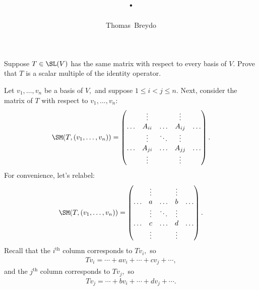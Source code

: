 \documentclass{amsart}
\title{\pagenum.\probnum}
\author{Thomas\ Breydo}
\begin{document}
\maketitle

\begin{problem*}
Suppose $T\in\SL(V)$ has the same matrix with respect to every
basis of $V.$ Prove that $T$ is a scalar multiple of the
identity operator.
\end{problem*}

\vspace{0.5in}

Let $v_1,\ldots,v_n$ be a basis of $V,$ and suppose $1\le i<j\le n.$
Next, consider the matrix of $T$ with respect to $v_1,\ldots,v_n$:
\begin{align*}
\SM(T,(v_1,\ldots,v_n)) =
    \begin{pmatrix}
        & \vdots & & \vdots & \\
       \hdots & A_{ii} & \hdots & A_{ij} & \hdots \\
                & \vdots & \ddots & \vdots & \\
       \hdots & A_{ji} & \hdots & A_{jj} & \hdots \\
              & \vdots & & \vdots &
    \end{pmatrix}.
\end{align*}
For convenience, let's relabel:
\begin{align*}
\SM(T,(v_1,\ldots,v_n)) =
    \begin{pmatrix}
        & \vdots & & \vdots & \\
       \hdots & a & \hdots & b & \hdots \\
                & \vdots & \ddots & \vdots & \\
       \hdots & c & \hdots & d & \hdots \\
              & \vdots & & \vdots &
    \end{pmatrix}.
\end{align*}
Recall that the $i^\text{th}$ column corresponds to $Tv_i,$ so
\begin{align*}
    Tv_i=\cdots+av_i+\cdots+cv_j+\cdots,
\end{align*}
and the $j^\text{th}$ column corresponds to $Tv_j,$ so
\begin{align*}
    Tv_j=\cdots+bv_i+\cdots+dv_j+\cdots.
\end{align*}
\end{document}
